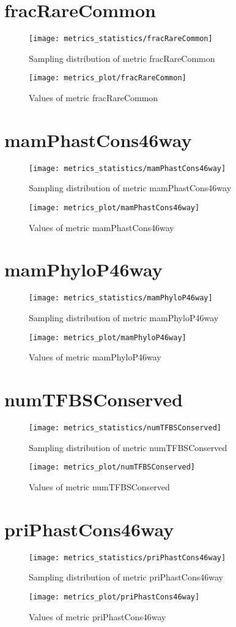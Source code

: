 \section{fracRareCommon}
\begin{figure}
  \texttt{[image: metrics\_statistics/fracRareCommon]}
  \caption{Sampling distribution of metric fracRareCommon}
\end{figure}
\begin{figure}
  \texttt{[image: metrics\_plot/fracRareCommon]}
  \caption{Values of metric fracRareCommon}
\end{figure}
\section{mamPhastCons46way}
\begin{figure}
  \texttt{[image: metrics\_statistics/mamPhastCons46way]}
  \caption{Sampling distribution of metric mamPhastCons46way}
\end{figure}
\begin{figure}
  \texttt{[image: metrics\_plot/mamPhastCons46way]}
  \caption{Values of metric mamPhastCons46way}
\end{figure}
\section{mamPhyloP46way}
\begin{figure}
  \texttt{[image: metrics\_statistics/mamPhyloP46way]}
  \caption{Sampling distribution of metric mamPhyloP46way}
\end{figure}
\begin{figure}
  \texttt{[image: metrics\_plot/mamPhyloP46way]}
  \caption{Values of metric mamPhyloP46way}
\end{figure}
\section{numTFBSConserved}
\begin{figure}
  \texttt{[image: metrics\_statistics/numTFBSConserved]}
  \caption{Sampling distribution of metric numTFBSConserved}
\end{figure}
\begin{figure}
  \texttt{[image: metrics\_plot/numTFBSConserved]}
  \caption{Values of metric numTFBSConserved}
\end{figure}
\section{priPhastCons46way}
\begin{figure}
  \texttt{[image: metrics\_statistics/priPhastCons46way]}
  \caption{Sampling distribution of metric priPhastCons46way}
\end{figure}
\begin{figure}
  \texttt{[image: metrics\_plot/priPhastCons46way]}
  \caption{Values of metric priPhastCons46way}
\end{figure}

